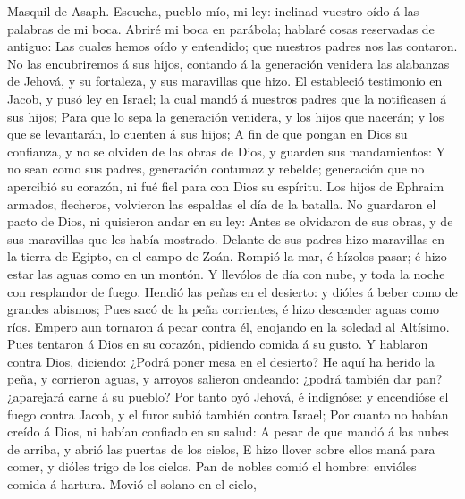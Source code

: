  Masquil de Asaph. Escucha, pueblo mío, mi ley: inclinad
vuestro oído á las palabras de mi boca.  Abriré mi boca en
parábola; hablaré cosas reservadas de antiguo:  Las cuales
hemos oído y entendido; que nuestros padres nos las contaron.
 No las encubriremos á sus hijos, contando á la generación
venidera las alabanzas de Jehová, y su fortaleza, y sus maravillas que
hizo.  El estableció testimonio en Jacob, y pusó ley en
Israel; la cual mandó á nuestros padres que la notificasen á sus hijos;
 Para que lo sepa la generación venidera, y los hijos que
nacerán; y los que se levantarán, lo cuenten á sus hijos; 
A fin de que pongan en Dios su confianza, y no se olviden de las obras
de Dios, y guarden sus mandamientos:  Y no sean como sus
padres, generación contumaz y rebelde; generación que no apercibió su
corazón, ni fué fiel para con Dios su espíritu.  Los hijos
de Ephraim armados, flecheros, volvieron las espaldas el día de la
batalla.  No guardaron el pacto de Dios, ni quisieron
andar en su ley:  Antes se olvidaron de sus obras, y de
sus maravillas que les había mostrado.  Delante de sus
padres hizo maravillas en la tierra de Egipto, en el campo de Zoán.
 Rompió la mar, é hízolos pasar; é hizo estar las aguas
como en un montón.  Y llevólos de día con nube, y toda la
noche con resplandor de fuego.  Hendió las peñas en el
desierto: y dióles á beber como de grandes abismos;  Pues
sacó de la peña corrientes, é hizo descender aguas como ríos.
 Empero aun tornaron á pecar contra él, enojando en la
soledad al Altísimo.  Pues tentaron á Dios en su corazón,
pidiendo comida á su gusto.  Y hablaron contra Dios,
diciendo: ¿Podrá poner mesa en el desierto?  He aquí ha
herido la peña, y corrieron aguas, y arroyos salieron ondeando: ¿podrá
también dar pan? ¿aparejará carne á su pueblo?  Por tanto
oyó Jehová, é indignóse: y encendióse el fuego contra Jacob, y el furor
subió también contra Israel;  Por cuanto no habían creído
á Dios, ni habían confiado en su salud:  A pesar de que
mandó á las nubes de arriba, y abrió las puertas de los cielos,
 E hizo llover sobre ellos maná para comer, y dióles
trigo de los cielos.  Pan de nobles comió el hombre:
envióles comida á hartura.  Movió el solano en el cielo,
